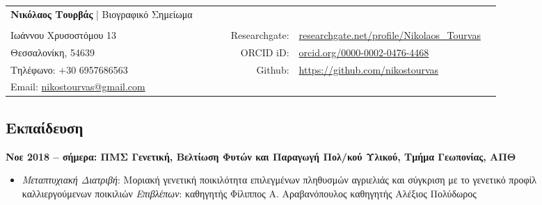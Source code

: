 \documentclass[12pt,]{scrartcl}
\date{}
\begin{document}
\begin{table}[h]
{\def\arraystretch{1.0}\tabcolsep=0pt
\begin{tabular}{p{0.42\linewidth}p{0.05\linewidth}p{0.35\linewidth}}

  \multirow{1}{*}{\LARGE \textbf{Νικόλαος Τουρβάς} | Βιογραφικό Σημείωμα} &  &  \\
  
  & & \\
  
  Ιωάννου Χρυσοστόμου 13 & \multicolumn{1}{r}{Researchgate:\;\;} & \multicolumn{1}{l}{\url{researchgate.net/profile/Nikolaos_Tourvas}} \\
  
  Θεσσαλονίκη, 54639 & \multicolumn{1}{r}{ORCID iD:\;\;} & \multicolumn{1}{l}{\href{https://orcid.org/0000-0002-0476-4468}{orcid.org/0000-0002-0476-4468}} \\
  
  Τηλέφωνο: $+$30 6957686563 & \multicolumn{1}{r}{Github:\;\;} & \multicolumn{1}{l}{\href{https://github.com/nikostourvas}{https://github.com/nikostourvas}} \\
  
  Email: {\href{nikostourvas@gmail.com}{nikostourvas@gmail.com}} 
\end{tabular}%
}
\end{table}


\subsection{Εκπαίδευση}\label{Εκπαίδευση}
\vspace{-3mm}

\textbf{Νοε 2018 -- σήμερα: ΠΜΣ Γενετική, Βελτίωση Φυτών και Παραγωγή Πολ/κού Υλικού, Τμήμα Γεωπονίας, ΑΠΘ}
\begin{itemize}
\setlength\itemsep{-0.5em}
\item \textit{Μεταπτυχιακή Διατριβή}: Μοριακή γενετική ποικιλότητα επιλεγμένων πληθυσμών αγριελιάς και σύγκριση με το γενετικό προφίλ καλλιεργούμενων ποικιλιών
\vspace{1mm}
\newline
\textit{Επιβλέπων}: καθηγητής Φίλιππος Α. Αραβανόπουλος \newline 
\phantom{1} \hspace{1.58cm} καθηγητής Αλέξιος Πολύδωρος
\end{itemize}

\vspace{2mm}
\end{document}
